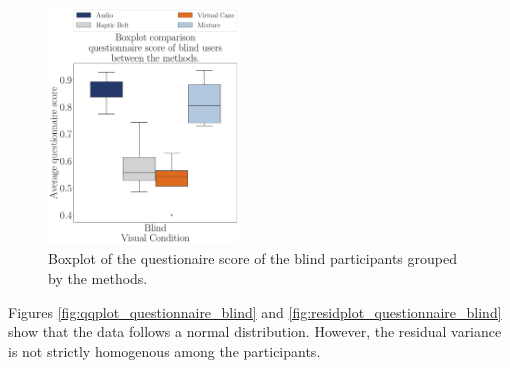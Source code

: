 \begin{figure}[!htb]
    \centering
    \includegraphics[width = 0.45\textwidth]{Resultados/Questionario/Figuras/pdf/boxplot_questionnaire_scene_blind.pdf}
    \caption{Boxplot of the questionaire score of the blind participants grouped by the methods.}
    \label{fig:boxplot_quest_blind_scene}
\end{figure}

%
%

Figures \ref{fig:qqplot_questionnaire_blind} and \ref{fig:residplot_questionnaire_blind} show that the data follows a normal distribution. However, the residual variance is not strictly homogenous among the participants. 


